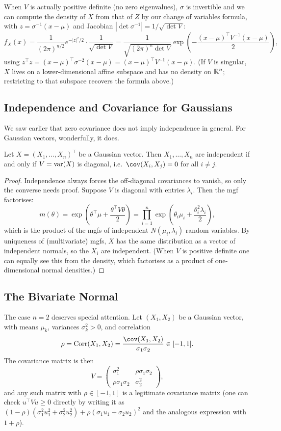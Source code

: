 \documentclass[a4paper]{scrartcl}
\newcommand{\corr}{\operatorname{Corr}}
\begin{document}
When $V$ is actually positive definite (no zero eigenvalues), $\sigma$ is invertible and we can compute the density of $X$ from that of $Z$ by our change of variables formula, with $z = \sigma^{-1}(x - \mu)$ and Jacobian $|\det \sigma^{-1}| = 1/\sqrt{\det V}$:
$$
f_X(x) = \frac{1}{(2\pi)^{n/2}}e^{-|z|^2/2}\cdot\frac{1}{\sqrt{\det V}} = \frac{1}{\sqrt{(2\pi)^n \det V}}\exp\left(-\frac{(x - \mu)^\top V^{-1}(x - \mu)}{2}\right),
$$
using $z^\top z = (x - \mu)^\top \sigma^{-2}(x - \mu) = (x - \mu)^\top V^{-1}(x-\mu)$. (If $V$ is singular, $X$ lives on a lower-dimensional affine subspace and has no density on $\mathbb{R}^n$; restricting to that subspace recovers the formula above.)

\subsection{Independence and Covariance for Gaussians}

We saw earlier that zero covariance does not imply independence in general. For Gaussian vectors, wonderfully, it does.

\begin{theorem}
	Let $X = (X_1, \dots, X_n)^\top$ be a Gaussian vector. Then $X_1, \dots, X_n$ are independent if and only if $V = \operatorname{var}(X)$ is diagonal, i.e.\ $\cov(X_i, X_j) = 0$ for all $i \neq j$.
\end{theorem}
\begin{proof}
	Independence always forces the off-diagonal covariances to vanish, so only the converse needs proof. Suppose $V$ is diagonal with entries $\lambda_i$. Then the mgf factorises:
	$$
	m(\theta) = \exp\left(\theta^\top\mu + \frac{\theta^\top V \theta}{2}\right) = \prod_{i = 1}^{n} \exp\left(\theta_i \mu_i + \frac{\theta_i^2\lambda_i}{2}\right),
	$$
	which is the product of the mgfs of independent $N(\mu_i, \lambda_i)$ random variables. By uniqueness of (multivariate) mgfs, $X$ has the same distribution as a vector of independent normals, so the $X_i$ are independent. (When $V$ is positive definite one can equally see this from the density, which factorises as a product of one-dimensional normal densities.)
\end{proof}

\subsection{The Bivariate Normal}

The case $n = 2$ deserves special attention. Let $(X_1, X_2)$ be a Gaussian vector, with means $\mu_k$, variances $\sigma_k^2 > 0$, and correlation
$$
\rho = \corr(X_1, X_2) = \frac{\cov(X_1, X_2)}{\sigma_1 \sigma_2} \in [-1, 1].
$$
The covariance matrix is then
$$
V = \begin{pmatrix}
	\sigma_1^2 & \rho\sigma_1\sigma_2 \\
	\rho\sigma_1\sigma_2 & \sigma_2^2
\end{pmatrix},
$$
and any such matrix with $\rho \in [-1, 1]$ is a legitimate covariance matrix (one can check $u^\top V u \geq 0$ directly by writing it as $(1 - \rho)(\sigma_1^2 u_1^2 + \sigma_2^2 u_2^2) + \rho(\sigma_1 u_1 + \sigma_2 u_2)^2$ and the analogous expression with $1 + \rho$).
\end{document}
